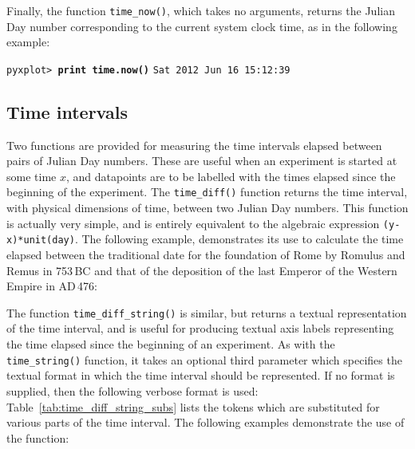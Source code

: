 Finally, the function {\tt time\_now()}, which takes no
arguments, returns the Julian Day number corresponding to the current system
clock time, as in the following example:

\vspace{3mm}
\noindent\texttt{pyxplot> \textbf{print time.now()}}\newline
\noindent\texttt{Sat 2012 Jun 16 15:12:39}
\vspace{3mm}


\subsection{Time intervals}

Two functions are provided for measuring the time intervals elapsed between
pairs of Julian Day numbers.  These are useful when an experiment is started at
some time $x$, and datapoints are to be labelled with the times elapsed since
the beginning of the experiment. The {\tt time\_diff()}
function returns the time
interval, with physical dimensions of time, between two Julian Day numbers.
This function is actually very simple, and is entirely equivalent to the
algebraic expression {\tt (y-x)*unit(day)}. The following example, demonstrates
its use to calculate the time elapsed between the traditional date for the
foundation of Rome by Romulus and Remus in 753\,{\footnotesize BC} and that of
the deposition of the last Emperor of the Western Empire in {\footnotesize
AD}\,476:

\vspace{3mm}

\vspace{3mm}

The function {\tt time\_diff\_string()} is similar, but returns a
textual representation of the time interval, and is useful for producing
textual axis labels representing the time elapsed since the beginning of an
experiment. As with the {\tt time\_string()} function, it takes an optional
third parameter which specifies the textual format in which the time interval
should be represented. If no format is supplied, then the following verbose
format is used:\vspace{3mm}\newline
{}\vspace{3mm}\newline
Table~\ref{tab:time_diff_string_subs} lists the tokens which are substituted
for various parts of the time interval. The following examples demonstrate the
use of the function:

